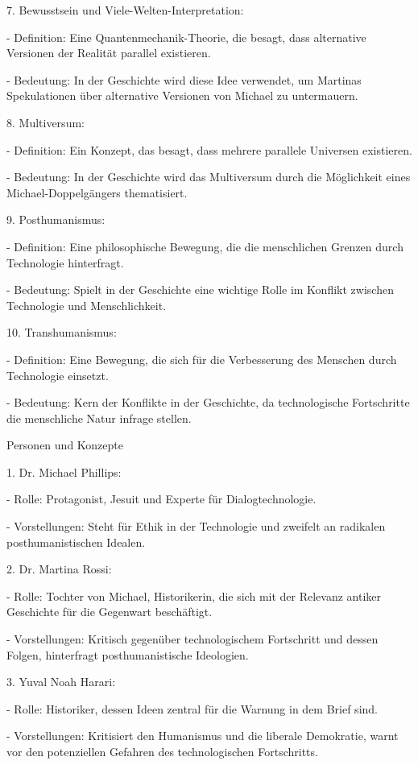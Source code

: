\documentclass[
]{article}
\begin{document}
7. Bewusstsein und Viele-Welten-Interpretation:

- Definition: Eine Quantenmechanik-Theorie, die besagt, dass alternative
Versionen der Realität parallel existieren.

- Bedeutung: In der Geschichte wird diese Idee verwendet, um Martinas
Spekulationen über alternative Versionen von Michael zu untermauern.

8. Multiversum:

- Definition: Ein Konzept, das besagt, dass mehrere parallele Universen
existieren.

- Bedeutung: In der Geschichte wird das Multiversum durch die
Möglichkeit eines Michael-Doppelgängers thematisiert.

9. Posthumanismus:

- Definition: Eine philosophische Bewegung, die die menschlichen Grenzen
durch Technologie hinterfragt.

- Bedeutung: Spielt in der Geschichte eine wichtige Rolle im Konflikt
zwischen Technologie und Menschlichkeit.

10. Transhumanismus:

- Definition: Eine Bewegung, die sich für die Verbesserung des Menschen
durch Technologie einsetzt.

- Bedeutung: Kern der Konflikte in der Geschichte, da technologische
Fortschritte die menschliche Natur infrage stellen.

Personen und Konzepte

1. Dr. Michael Phillips:

- Rolle: Protagonist, Jesuit und Experte für Dialogtechnologie.

- Vorstellungen: Steht für Ethik in der Technologie und zweifelt an
radikalen posthumanistischen Idealen.

2. Dr. Martina Rossi:

- Rolle: Tochter von Michael, Historikerin, die sich mit der Relevanz
antiker Geschichte für die Gegenwart beschäftigt.

- Vorstellungen: Kritisch gegenüber technologischem Fortschritt und
dessen Folgen, hinterfragt posthumanistische Ideologien.

3. Yuval Noah Harari:

- Rolle: Historiker, dessen Ideen zentral für die Warnung in dem Brief
sind.

- Vorstellungen: Kritisiert den Humanismus und die liberale Demokratie,
warnt vor den potenziellen Gefahren des technologischen Fortschritts.
\end{document}
